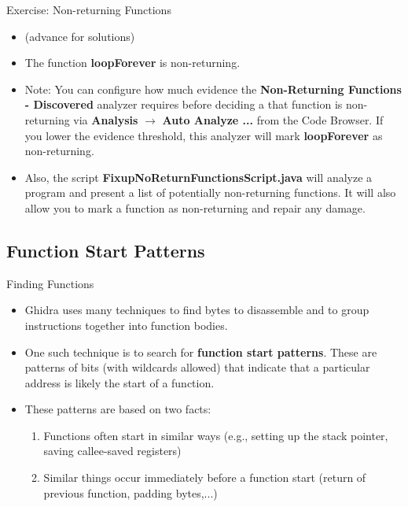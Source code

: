 \documentclass{beamer}
\begin{document}
\begin{frame}
\begin{block}{Exercise: Non-returning Functions}
\begin{itemize}
\item[] (advance for solutions)
\pause
\item The function \textbf{loopForever} is non-returning. 
\item Note: You can configure how much evidence the \textbf{Non-Returning Functions - Discovered} analyzer requires before deciding a that function is non-returning via 
\textbf{Analysis} $\rightarrow$ \textbf{Auto Analyze ...} from the Code Browser. If you lower the evidence threshold, this analyzer will mark \textbf{loopForever} as
non-returning.
\item Also, the script \textbf{FixupNoReturnFunctionsScript.java} will analyze a program and present a list of potentially non-returning functions.
It will also allow you to mark a function as non-returning and repair any damage.
\end{itemize}
\end{block}
\end{frame}


\subsection{Function Start Patterns}

\begin{frame}
\begin{block}{Finding Functions}
\begin{itemize}
\item Ghidra uses many techniques to find bytes to disassemble and to group instructions together into function bodies.
\item One such technique is to search for \textbf{function start patterns}.  These are patterns of bits (with wildcards allowed) that indicate that a particular address is likely the
start of a function.
\item These patterns are based on two facts:
\begin{enumerate}
\item Functions often start in similar ways (e.g., setting up the stack pointer, saving callee-saved registers)
\item Similar things occur immediately before a function start (return of previous function, padding bytes,...)
\end{enumerate}
\end{itemize}
\end{block}
\end{frame}
\end{document}
